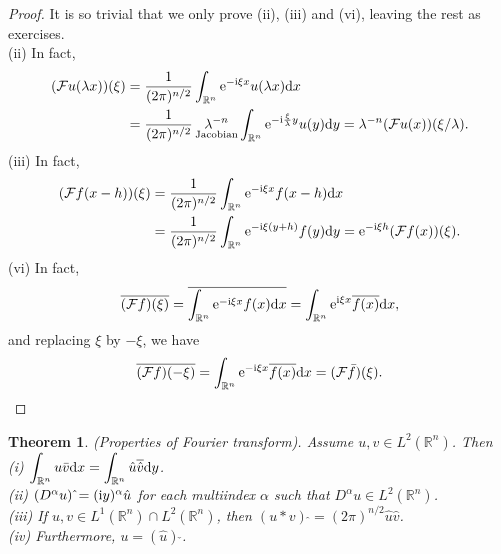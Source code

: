 \documentclass[hyperref,UTF8,12pt]{article}
\numberwithin{equation}{subsection}
\theoremstyle{plain}
\newtheorem{theorem}{Theorem}
\theoremstyle{definition}
\numberwithin{theorem}{section}
\numberwithin{lemma}{section}
\numberwithin{proposition}{section}
\numberwithin{remark}{section}
\numberwithin{corollary}{section}
\numberwithin{definition}{section}
\numberwithin{problem}{section}
\numberwithin{example}{section}
\def\e{\textup{e}}
\def\i{\textup{i}}
\def\dif{\textup{d}}
\newcommand{\dis}{\displaystyle}
\newcommand{\mr}{\mathbb{R}}
\begin{document}
\begin{proof}
It is so trivial that we only prove (ii), (iii) and (vi), leaving the rest as exercises.\\
(ii) In fact,\[
\begin{aligned}
	(\mathcal{F}u(\lambda x))(\xi)&=\frac{1}{(2\pi)^{n/2}}\int_{\mr^n}\e^{-\i\xi x}u(\lambda x)\dif x\\
	&=\frac{1}{(2\pi)^{n/2}}\mathop{\lambda^{-n}}_{\text{Jacobian}}\int_{\mr^n} \e^{-\i\frac{\xi}{\lambda}y}u(y)\dif y=\lambda^{-n}(\mathcal{F}u(x))(\xi/\lambda).
\end{aligned}\]
(iii) In fact, \[\begin{aligned}
	(\mathcal{F}f(x-h))(\xi)&=\frac{1}{(2\pi)^{n/2}}\int_{\mr^n}\e^{-\i\xi x}f(x-h)\dif x\\
	&=\frac{1}{(2\pi)^{n/2}}\int_{\mr^n}\e^{-\i\xi(y+h)}f(y)\dif y=\e^{-\i\xi h}(\mathcal{F}f(x))(\xi).
\end{aligned}\]
(vi) In fact, \[\overline{(\mathcal{F}f)(\xi)}=\overline{\int_{\mr^n}\e^{-\i\xi x}f(x)\dif x}=\int_{\mr^n}\e^{\i\xi x}\overline{f(x)}\dif x,\]and replacing $\xi$ by $-\xi$, we have \[\overline{(\mathcal{F}f)(-\xi)}=\int_{\mr^n}\e^{-\i\xi x}\overline{f(x)}\dif x=(\mathcal{F}\bar{f})(\xi).\]
\end{proof}
\begin{theorem}\label{thm3.2}
(Properties of Fourier transform). Assume $u,v\in L^2(\mr^n)$.
Then\\
\textup{(i)} $\dis\int_{\mr^n}u\bar{v}\dif x=\int_{\mr^n}\hat{u}\overline{\hat{v}}\dif y$.\\
\textup{(ii)} $(D^\alpha u)\,{\hat{}}=(\i y)^\alpha\hat{u} $ for each multiindex $\alpha$ such that $D^\alpha u\in L^2(\mr^n)$.\\
\textup{(iii)} If $u,v\in L^1(\mr^n)\cap L^2(\mr^n)$, then $(u*v)\,{\hat{}}=(2\pi)^{n/2}\hat{u}\hat{v}$.\\
\textup{(iv)} Furthermore, $u=(\hat{u})\,\check{}$.
\end{theorem}
\end{document}
